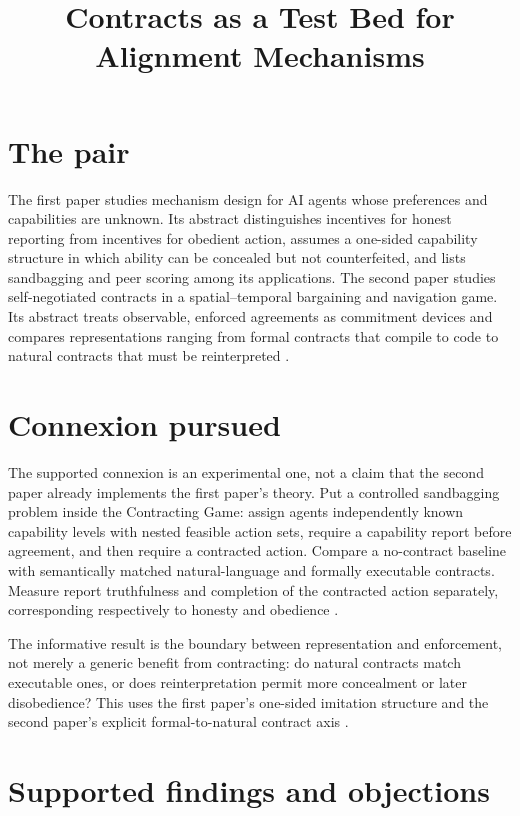 \documentclass{article}
\title{Contracts as a Test Bed for Alignment Mechanisms}
\begin{document}
\maketitle

\section{The pair}

The first paper studies mechanism design for AI agents whose preferences and
capabilities are unknown.  Its abstract distinguishes incentives for honest
reporting from incentives for obedient action, assumes a one-sided capability
structure in which ability can be concealed but not counterfeited, and lists
sandbagging and peer scoring among its applications.  The second paper studies
self-negotiated contracts in a spatial--temporal bargaining and navigation
game.  Its abstract treats observable, enforced agreements as commitment
devices and compares representations ranging from formal contracts that
compile to code to natural contracts that must be reinterpreted
.

\section{Connexion pursued}

The supported connexion is an experimental one, not a claim that the second
paper already implements the first paper's theory.  Put a controlled
sandbagging problem inside the Contracting Game: assign agents independently
known capability levels with nested feasible action sets, require a capability
report before agreement, and then require a contracted action.  Compare a
no-contract baseline with semantically matched natural-language and formally
executable contracts.  Measure report truthfulness and completion of the
contracted action separately, corresponding respectively to honesty and
obedience .

The informative result is the boundary between representation and enforcement,
not merely a generic benefit from contracting: do natural contracts match
executable ones, or does reinterpretation permit more concealment or later
disobedience?  This uses the first paper's one-sided imitation structure and
the second paper's explicit formal-to-natural contract axis
.

\section{Supported findings and objections}
\end{document}
